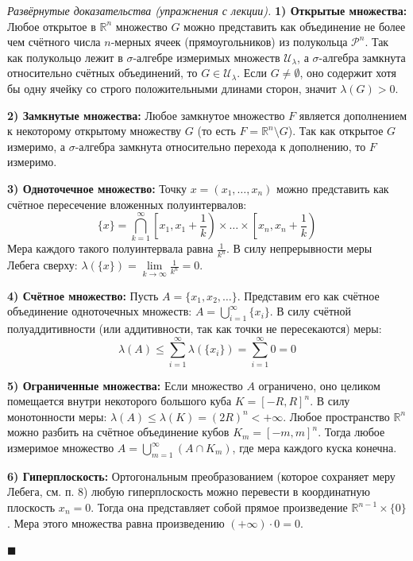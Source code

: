 \documentclass[12pt,a4paper]{article}
\newenvironment{Proof}[1][Доказательство]{\vspace{0.5em}\noindent\textit{#1.}\hspace{0.5em}\ignorespaces}{\hfill$\blacksquare$\vspace{1em}}
\begin{document}
\begin{Proof}[Развёрнутые доказательства (упражнения с лекции)]
\textbf{1) Открытые множества:} Любое открытое в $\mathbb{R}^n$ множество $G$ можно представить как объединение не более чем счётного числа $n$-мерных ячеек (прямоугольников) из полукольца $\mathcal{P}^n$. Так как полукольцо лежит в $\sigma$-алгебре измеримых множеств $\mathcal{U}_\lambda$, а $\sigma$-алгебра замкнута относительно счётных объединений, то $G \in \mathcal{U}_\lambda$. Если $G \neq \emptyset$, оно содержит хотя бы одну ячейку со строго положительными длинами сторон, значит $\lambda(G) > 0$.

\textbf{2) Замкнутые множества:} Любое замкнутое множество $F$ является дополнением к некоторому открытому множеству $G$ (то есть $F = \mathbb{R}^n \setminus G$). Так как открытое $G$ измеримо, а $\sigma$-алгебра замкнута относительно перехода к дополнению, то $F$ измеримо.

\textbf{3) Одноточечное множество:} Точку $x = (x_1, \dots, x_n)$ можно представить как счётное пересечение вложенных полуинтервалов: 
$$ \{x\} = \bigcap\limits_{k=1}^{\infty} \left[ x_1, x_1 + \frac{1}{k} \right) \times \dots \times \left[ x_n, x_n + \frac{1}{k} \right) $$
Мера каждого такого полуинтервала равна $\frac{1}{k^n}$. В силу непрерывности меры Лебега сверху: $\lambda(\{x\}) = \lim\limits_{k \to \infty} \frac{1}{k^n} = 0$.

\textbf{4) Счётное множество:} Пусть $A = \{x_1, x_2, \dots\}$. Представим его как счётное объединение одноточечных множеств: $A = \bigcup\limits_{i=1}^{\infty} \{x_i\}$. В силу счётной полуаддитивности (или аддитивности, так как точки не пересекаются) меры: 
$$ \lambda(A) \le \sum\limits_{i=1}^{\infty} \lambda(\{x_i\}) = \sum\limits_{i=1}^{\infty} 0 = 0 $$

\textbf{5) Ограниченные множества:} Если множество $A$ ограничено, оно целиком помещается внутри некоторого большого куба $K = [-R, R]^n$. В силу монотонности меры: $\lambda(A) \le \lambda(K) = (2R)^n < +\infty$.
Любое пространство $\mathbb{R}^n$ можно разбить на счётное объединение кубов $K_m = [-m, m]^n$. Тогда любое измеримое множество $A = \bigcup\limits_{m=1}^{\infty} (A \cap K_m)$, где мера каждого куска конечна.

\textbf{6) Гиперплоскость:} Ортогональным преобразованием (которое сохраняет меру Лебега, см. п. 8) любую гиперплоскость можно перевести в координатную плоскость $x_n = 0$. Тогда она представляет собой прямое произведение $\mathbb{R}^{n-1} \times \{0\}$. Мера этого множества равна произведению $(+\infty) \cdot 0 = 0$.


\end{Proof}
\end{document}
